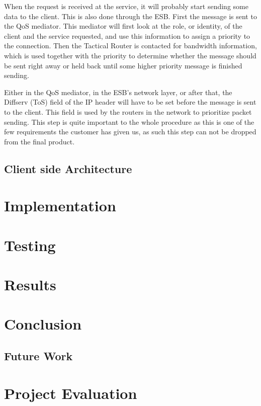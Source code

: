 \documentclass[12pt]{article}
\begin{document}
        When the request is received at the service, it will probably start sending some data to the client. This is also done through the ESB. First the message is sent to the QoS mediator. This mediator will first look at the role, or identity, of the client and the service requested, and use this information to assign a priority to the connection. Then the Tactical Router is contacted for bandwidth information, which is used together with the priority to determine whether the message should be sent right away or held back until some higher priority message is finished sending.

        Either in the QoS mediator, in the ESB’s network layer, or after that, the Diffserv (ToS) field of the IP header will have to be set before the message is sent to the client. This field is used by the routers in the network to prioritize packet sending. This step is quite important to the whole procedure as this is one of the few requirements the customer has given us, as such this step can not be dropped from the final product.
        
    \subsection{Client side Architecture}\label{clientsidearch}        
        
\section{Implementation}\label{implementation}
\section{Testing}\label{teting}
\section{Results}\label{results}
\section{Conclusion}\label{conclusion}
    \subsection{Future Work}\label{future}
\section{Project Evaluation}\label{evaluation}
\end{document}
